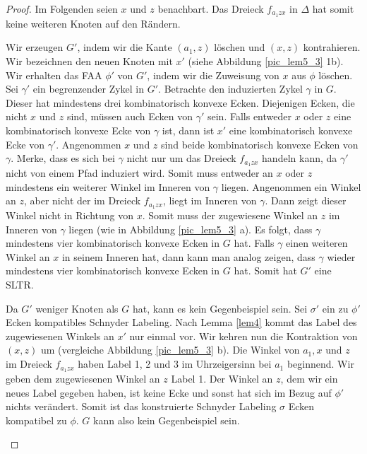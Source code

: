 \begin{proof}
Im Folgenden seien $x$ und $z$ benachbart. Das Dreieck $f_{a_1zx}$ in $\Delta$ hat somit keine weiteren Knoten auf den Rändern.
\begin{description}[leftmargin =0pt, font = \rmfamily ,listparindent=\parindent,parsep=0pt]
\item[Fall 1a:] Wir erzeugen $G'$, indem wir die Kante $(a_1,z)$ löschen und $(x,z)$ kontrahieren. Wir bezeichnen den neuen Knoten mit $x'$ (siehe Abbildung \ref{pic_lem5_3} 1b). Wir erhalten das FAA $\phi'$ von $G'$, indem wir die Zuweisung von $x$ aus $\phi$ löschen. Sei $\gamma'$ ein begrenzender Zykel in $G'$. Betrachte den induzierten Zykel $\gamma$ in $G$. Dieser hat mindestens drei kombinatorisch konvexe Ecken. Diejenigen Ecken, die nicht $x$ und $z$ sind, müssen auch Ecken von $\gamma'$ sein. Falls entweder $x$ oder $z$ eine kombinatorisch konvexe Ecke von $\gamma$ ist, dann ist $x'$ eine kombinatorisch konvexe Ecke von $\gamma'$. Angenommen $x$ und $z$ sind beide kombinatorisch konvexe Ecken von $\gamma$. Merke, dass es sich bei $\gamma$ nicht nur um das Dreieck $f_{a_1zx}$ handeln kann, da $\gamma'$ nicht von einem Pfad induziert wird. Somit muss entweder an $x$ oder $z$ mindestens ein weiterer Winkel im Inneren von $\gamma$ liegen. Angenommen ein Winkel an $z$, aber nicht der im Dreieck $f_{a_1zx}$, liegt im Inneren von $\gamma$. Dann zeigt dieser Winkel nicht in Richtung von $x$. Somit muss der zugewiesene Winkel an $z$ im Inneren von $\gamma$ liegen (wie in Abbildung \ref{pic_lem5_3} a). Es folgt, dass $\gamma$ mindestens vier kombinatorisch konvexe Ecken in $G$ hat. Falls $\gamma$ einen weiteren Winkel an $x$ in seinem Inneren hat, dann kann man analog zeigen, dass $\gamma$ wieder mindestens vier kombinatorisch konvexe Ecken in $G$ hat. Somit hat $G'$ eine SLTR.

Da $G'$ weniger Knoten als $G$ hat, kann es kein Gegenbeispiel sein. Sei $\sigma'$ ein zu $\phi'$ Ecken kompatibles Schnyder Labeling. Nach Lemma \ref{lem4} kommt das Label des zugewiesenen Winkels an $x'$ nur einmal vor. Wir kehren nun die Kontraktion von $(x,z)$ um (vergleiche Abbildung \ref{pic_lem5_3} b). Die Winkel von $a_1,x$ und $z$ im Dreieck $f_{a_1zx}$ haben Label 1, 2 und 3 im Uhrzeigersinn bei $a_1$ beginnend. Wir geben dem zugewiesenen Winkel an $z$ Label 1. Der Winkel an $z$, dem wir ein neues Label gegeben haben, ist keine Ecke und sonst hat sich im Bezug auf $\phi'$ nichts verändert. Somit ist das konstruierte Schnyder Labeling $\sigma$ Ecken kompatibel zu $\phi$. $G$ kann also kein Gegenbeispiel sein.


\end{description}
\end{proof}
